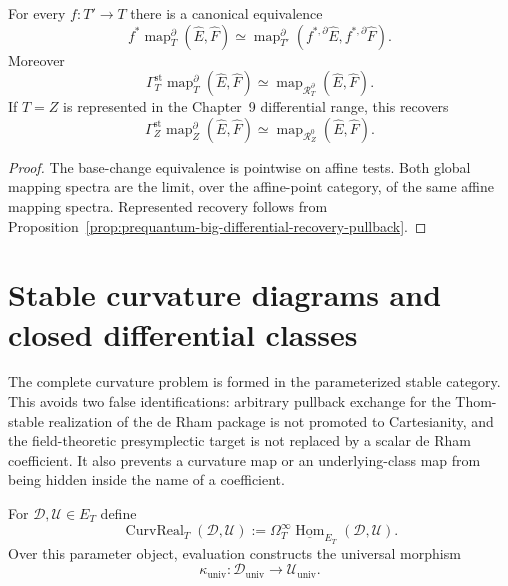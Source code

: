 \begin{proposition}
\label{prop:prequantum-mapping-spectrum-base-change}
For every $f:T'\to T$ there is a canonical equivalence
\[
\boxed{
f^*\operatorname{map}^{\partial}_T(\widehat E,\widehat F)
\simeq
\operatorname{map}^{\partial}_{T'}
(f^{*,\partial}\widehat E,f^{*,\partial}\widehat F).
}
\]
Moreover
\[
\boxed{
\Gamma_T^{\mathrm{st}}
\operatorname{map}^{\partial}_T(\widehat E,\widehat F)
\simeq
\operatorname{map}_{\mathcal R_T^{\partial}}(\widehat E,\widehat F).
}
\]
If $T=Z$ is represented in the Chapter~9 differential range, this recovers
\[
\Gamma_Z^{\mathrm{st}}
\operatorname{map}^{\partial}_Z(\widehat E,\widehat F)
\simeq
\operatorname{map}_{\mathcal R_Z^0}(\widehat E,\widehat F).
\]
\end{proposition}

\begin{proof}
The base-change equivalence is pointwise on affine tests.  Both global mapping
spectra are the limit, over the affine-point category, of the same affine mapping
spectra.  Represented recovery follows from
Proposition~\ref{prop:prequantum-big-differential-recovery-pullback}.
\end{proof}

\section{Stable curvature diagrams and closed differential classes}
\label{sec:prequantum-stable-curvature-diagrams}

The complete curvature problem is formed in the parameterized stable category.
This avoids two false identifications: arbitrary pullback exchange for the
Thom-stable realization of the de Rham package is not promoted to Cartesianity,
and the field-theoretic presymplectic target is not replaced by a scalar de Rham
coefficient.  It also prevents a curvature map or an underlying-class map from
being hidden inside the name of a coefficient.

\begin{construction}
\label{constr:prequantum-curvature-realization-object}
For $\mathscr D,\mathscr U\in E_T$ define
\[
\boxed{
\operatorname{CurvReal}_T(\mathscr D,\mathscr U)
:=
\Omega_T^\infty
\underline{\operatorname{Hom}}_{E_T}(\mathscr D,\mathscr U).
}
\]
Over this parameter object, evaluation constructs the universal morphism
\[
\kappa_{\mathrm{univ}}:
\mathscr D_{\mathrm{univ}}\longrightarrow\mathscr U_{\mathrm{univ}}.
\]
\end{construction}

